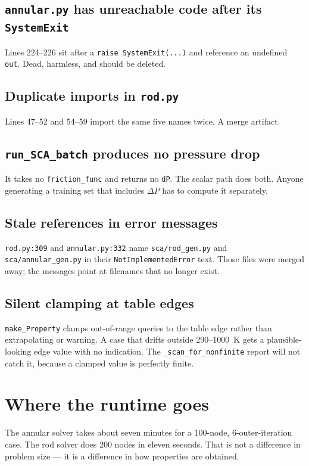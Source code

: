 \documentclass[11pt]{article}
\newcommand{\code}[1]{\texttt{#1}}
\begin{document}
\subsection{\code{annular.py} has unreachable code after its \code{SystemExit}}
Lines 224--226 sit after a \code{raise SystemExit(...)} and reference an undefined
\code{out}. Dead, harmless, and should be deleted.

\subsection{Duplicate imports in \code{rod.py}}
Lines 47--52 and 54--59 import the same five names twice. A merge artifact.

\subsection{\code{run\_SCA\_batch} produces no pressure drop}
It takes no \code{friction\_func} and returns no \code{dP}. The scalar path does both.
Anyone generating a training set that includes $\Delta P$ has to compute it separately.

\subsection{Stale references in error messages}
\code{rod.py:309} and \code{annular.py:332} name \code{sca/rod\_gen.py} and
\code{sca/annular\_gen.py} in their \code{NotImplementedError} text. Those files were
merged away; the messages point at filenames that no longer exist.

\subsection{Silent clamping at table edges}
\code{make\_Property} clamps out-of-range queries to the table edge rather than
extrapolating or warning. A case that drifts outside 290--1000~K gets a plausible-looking
edge value with no indication. The \code{\_scan\_for\_nonfinite} report will not catch it,
because a clamped value is perfectly finite.

\section{Where the runtime goes}
\label{sec:lutopportunity}

The annular solver takes about seven minutes for a 100-node, 6-outer-iteration case. The
rod solver does 200 nodes in eleven seconds. That is not a difference in problem size ---
it is a difference in how properties are obtained.
\end{document}
